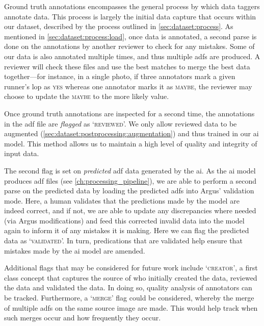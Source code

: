 Ground truth annotations encompasses the general process by which data taggers annotate data. This process is largely the initial data capture that occurs within our dataset, described by the process outlined in \cref{sec:dataset:process}. As mentioned in \cref{sec:dataset:process:load}, once data is annotated, a second parse is done on the annotations by another reviewer to check for any mistakes. Some of our data is also annotated multiple times, and thus multiple \glspl{adf} are produced. A reviewer will check these files and use the best matches to merge the best data together---for instance, in a single photo, if three annotators mark a given runner's \gls{lop} as \textsc{yes} whereas one annotator marks it as \textsc{maybe}, the reviewer may choose to update the \textsc{maybe} to the more likely value.

Once ground truth annotations are inspected for a second time, the annotations in the \gls{adf} file are \textit{flagged} as `\textsc{reviewed}'. We only allow reviewed data to be augmented (\cref{sec:dataset:postprocessing:augmentation}) and thus trained in our \gls{ai} model. This method allows us to maintain a high level of quality and integrity of input data.

The second flag is set on \textit{predicted} \gls{adf} data generated by the \gls{ai}. As the \gls{ai} model produces \gls{adf} files (see \cref{ch:processing_pipeline}), we are able to perform a second parse on the predicted data by loading the predicted \glspl{adf} into Argus' validation mode. Here, a human validates that the predictions made by the model are indeed correct, and if not, we are able to update any discrepancies where needed (via Argus modifications) and feed this corrected invalid data into the model again to inform it of any mistakes it is making. Here we can flag the predicted data as `\textsc{validated}'. In turn, predications that are validated help ensure that mistakes made by the \gls{ai} model are amended. 

Additional flags that may be considered for future work include `\textsc{creator}', a first class concept that captures the source of who initially created the data, reviewed the data and validated the data. In doing so, quality analysis of annotators can be tracked. Furthermore, a `\textsc{merge}' flag could be considered, whereby the merge of multiple \glspl{adf} on the same source image are made. This would help track when such merges occur and how frequently they occur.

